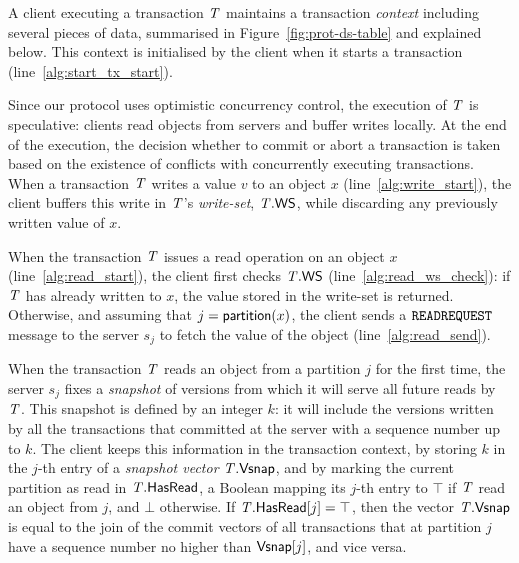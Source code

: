 A client executing a transaction $\mathit{T}$ maintains a transaction \emph{context} including several pieces of data, summarised in Figure~\ref{fig:prot-ds-table} and explained below. This context is initialised by the client when it starts a transaction (line~\ref{alg:start_tx_start}).

Since our protocol uses optimistic concurrency control, the execution of $\mathit{T}$ is speculative: clients read objects from servers and buffer writes locally. At the end of the execution, the decision whether to commit or abort a transaction is taken based on the existence of conflicts with concurrently executing transactions. When a transaction $\mathit{T}$ writes a value $v$ to an object $x$ (line~\ref{alg:write_start}), the client buffers this write in $\mathit{T}$'s \emph{write-set}, $\mathit{T}.\mathsf{WS}$, while discarding any previously written value of $x$.

When the transaction $\mathit{T}$ issues a read operation on an object $x$ (line~\ref{alg:read_start}), the client first checks $\mathit{T}.\mathsf{WS}$ (line~\ref{alg:read_ws_check}): if $\mathit{T}$ has already written to $x$, the value stored in the write-set is returned. Otherwise, and assuming that $j = \mathsf{partition}(x)$, the client sends a ${\tt READREQUEST}$ message to the server $s_j$ to fetch the value of the object (line~\ref{alg:read_send}).

When the transaction $\mathit{T}$ reads an object from a partition $j$ for the first time, the server $s_j$ fixes a \emph{snapshot} of versions from which it will serve all future reads by $\mathit{T}$. This snapshot is defined by an integer $k$: it will include the versions written by all the transactions that committed at the server with a sequence number up to $k$. The client keeps this information in the transaction context, by storing $k$ in the $j$-th entry of a \emph{snapshot vector} $\mathit{T}.\mathsf{Vsnap}$, and by marking the current partition as read in $\mathit{T}.\mathsf{HasRead}$, a Boolean mapping its $j$-th entry to $\top$ if $\mathit{T}$ read an object from $j$, and $\bot$ otherwise. If $\mathit{T}.\mathsf{HasRead}[j]=\top$, then the vector $\mathit{T}.\mathsf{Vsnap}$ is equal to the join of the commit vectors of all transactions that at partition $j$ have a sequence number no higher than $\mathsf{Vsnap}[j]$, and vice versa.

